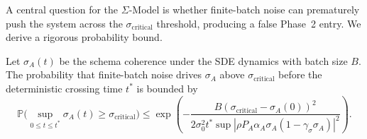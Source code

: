 A central question for the $\Sigma$-Model is whether finite-batch noise
can prematurely push the system across the $\sigma_{\mathrm{critical}}$
threshold, producing a false Phase~2 entry. We derive a rigorous
probability bound.

\begin{theorem}
\label{thm:fluctuation}
Let $\sigma_A(t)$ be the schema coherence under the SDE dynamics with
batch size $B$. The probability that finite-batch noise drives $\sigma_A$
above $\sigma_{\mathrm{critical}}$ before the deterministic crossing
time $t^*$ is bounded by
\[
\mathbb{P}\bigl(\sup_{0 \leq t \leq t^*} \sigma_A(t) \geq
\sigma_{\mathrm{critical}}\bigr)
\leq \exp\!\left(
-\frac{B (\sigma_{\mathrm{critical}} - \sigma_A(0))^2}
{2 \sigma_0^2 t^* \sup|\rho P_A \alpha_A \sigma_A (1 - \gamma_\sigma \sigma_A)|^2}
\right).
\]
\end{theorem}

